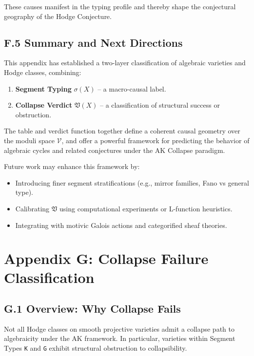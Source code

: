 \documentclass[11pt]{article}
\begin{document}
These causes manifest in the typing profile and thereby shape the conjectural geography of the Hodge Conjecture.

\subsection*{F.5 Summary and Next Directions}

This appendix has established a two-layer classification of algebraic varieties and Hodge classes, combining:

\begin{enumerate}
  \item \textbf{Segment Typing} $\sigma(X)$ – a macro-causal label.
  \item \textbf{Collapse Verdict} $\mathfrak{V}(X)$ – a classification of structural success or obstruction.
\end{enumerate}

The table and verdict function together define a coherent causal geometry over the moduli space $\mathcal{V}$, and offer a powerful framework for predicting the behavior of algebraic cycles and related conjectures under the AK Collapse paradigm.

Future work may enhance this framework by:

\begin{itemize}
  \item Introducing finer segment stratifications (e.g., mirror families, Fano vs general type).
  \item Calibrating $\mathfrak{V}$ using computational experiments or L-function heuristics.
  \item Integrating with motivic Galois actions and categorified sheaf theories.
\end{itemize}



\section*{Appendix G: Collapse Failure Classification}

\subsection*{G.1 Overview: Why Collapse Fails}

Not all Hodge classes on smooth projective varieties admit a collapse path to algebraicity under the AK framework.  
In particular, varieties within Segment Types \texttt{K} and \texttt{G} exhibit structural obstruction to collapsibility.
\end{document}
